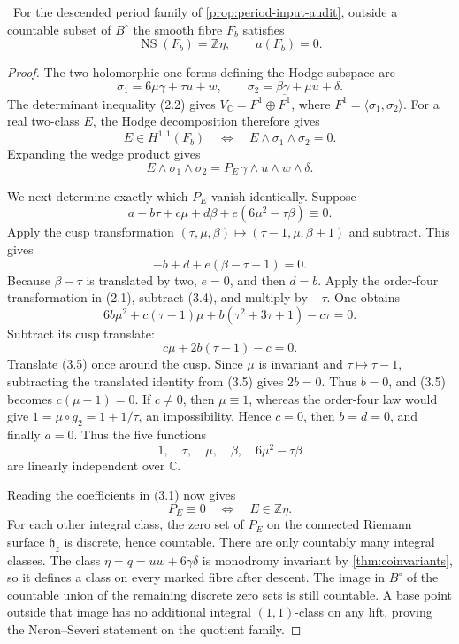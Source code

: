 \begin{proposition}
\label{prop:very-general-torus-audit}
\Verified\ For the descended period family of
\cref{prop:period-input-audit}, outside a countable subset of
\(B^\circ\) the smooth fibre
\(F_b\) satisfies
\[
 \operatorname{NS}(F_b)=\mathbb Z\eta,
 \qquad a(F_b)=0.
\tag{3.2}
\]
\end{proposition}

\begin{proof}
The two holomorphic one-forms defining the Hodge subspace are
\[
 \sigma_1=6\mu\gamma+\tau u+w,
 \qquad
 \sigma_2=\beta\gamma+\mu u+\delta.
\]
The determinant inequality (2.2) gives
\(V_{\mathbb C}=F^1\oplus\overline{F^1}\), where
\(F^1=\langle\sigma_1,\sigma_2\rangle\).  For a real two-class \(E\),
the Hodge decomposition therefore gives
\[
 E\in H^{1,1}(F_b)
 \quad\Longleftrightarrow\quad
 E\wedge\sigma_1\wedge\sigma_2=0.
\]
Expanding the wedge product gives
\[
 E\wedge\sigma_1\wedge\sigma_2
 =P_E\,\gamma\wedge u\wedge w\wedge\delta.
\tag{3.3}
\]

We next determine exactly which \(P_E\) vanish identically.  Suppose
\[
 a+b\tau+c\mu+d\beta+e(6\mu^2-\tau\beta)\equiv0.
\tag{3.4}
\]
Apply the cusp transformation
\((\tau,\mu,\beta)\mapsto(\tau-1,\mu,\beta+1)\) and subtract.  This gives
\[
 -b+d+e(\beta-\tau+1)=0.
\]
Because \(\beta-\tau\) is translated by two, \(e=0\), and then \(d=b\).
Apply the order-four transformation in (2.1), subtract (3.4), and multiply
by \(-\tau\).  One obtains
\[
 6b\mu^2+c(\tau-1)\mu+b(\tau^2+3\tau+1)-c\tau=0.
\]
Subtract its cusp translate:
\[
 c\mu+2b(\tau+1)-c=0.
\tag{3.5}
\]
Translate (3.5) once around the cusp.  Since \(\mu\) is invariant and
\(\tau\mapsto\tau-1\), subtracting the translated identity from (3.5)
gives \(2b=0\).  Thus \(b=0\), and (3.5) becomes
\(c(\mu-1)=0\).  If \(c\ne0\), then \(\mu\equiv1\), whereas the
order-four law would give
\(1=\mu\circ g_2=1+1/\tau\), an impossibility.  Hence \(c=0\), then
\(b=d=0\), and finally \(a=0\).
Thus the five functions
\[
 1,\quad\tau,\quad\mu,\quad\beta,\quad6\mu^2-\tau\beta
\]
are linearly independent over \(\mathbb C\).

Reading the coefficients in (3.1) now gives
\[
 P_E\equiv0\quad\Longleftrightarrow\quad E\in\mathbb Z\eta.
\tag{3.6}
\]
For each other integral class, the zero set of \(P_E\) on the connected
Riemann surface \(\mathfrak h_z\) is discrete, hence countable.  There are
only countably many integral classes.  The class
\(\eta=q=uw+6\gamma\delta\) is monodromy invariant by
\cref{thm:coinvariants}, so it defines a class on every marked fibre after
descent.  The image in \(B^\circ\) of the countable union of the remaining
discrete zero sets is still countable.  A base point outside that image has
no additional integral \((1,1)\)-class on any lift, proving the
Neron--Severi statement on the quotient family.


\end{proof}
